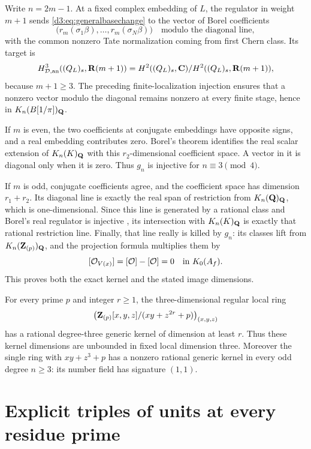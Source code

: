 Write $n=2m-1$. At a fixed complex embedding of $L$, the regulator in weight $m+1$ sends \eqref{d3:eq:generalbasechange} to the vector of Borel coefficients
\[
\bigl(r_m(\sigma_1\beta),\ldots,r_m(\sigma_N\beta)\bigr)
\quad\text{modulo the diagonal line},
\]
with the common nonzero Tate normalization coming from first Chern class. Its target is
\[
H_{\mathcal D,\mathrm{an}}^3((Q_L)_s,\mathbf R(m+1))
=H^2((Q_L)_s,\mathbf C)/H^2((Q_L)_s,\mathbf R(m+1)),
\]
because $m+1\geq3$. The preceding finite-localization injection ensures that a nonzero vector modulo the diagonal remains nonzero at every finite stage, hence in $K_n(B[1/\pi])_{\mathbf Q}$.

If $m$ is even, the two coefficients at conjugate embeddings have opposite signs, and a real embedding contributes zero. Borel's theorem \cite[Proposition~12.2]{Borel} identifies the real scalar extension of $K_n(K)_{\mathbf Q}$ with this $r_2$-dimensional coefficient space. A vector in it is diagonal only when it is zero. Thus $g_n$ is injective for $n\equiv3\pmod4$.

If $m$ is odd, conjugate coefficients agree, and the coefficient space has dimension $r_1+r_2$. Its diagonal line is exactly the real span of restriction from $K_n(\mathbf Q)_{\mathbf Q}$, which is one-dimensional. Since this line is generated by a rational class and Borel's real regulator is injective \cite[Section~6]{BunkeTamme}, its intersection with $K_n(K)_{\mathbf Q}$ is exactly that rational restriction line. Finally, that line really is killed by $g_n$: its classes lift from $K_n(\mathbf Z_{(p)})_{\mathbf Q}$, and the projection formula multiplies them by
\[
[\mathcal O_{V(x)}]=[\mathcal O]-[\mathcal O]=0\quad\text{in }K_0(A_f).
\]
This proves both the exact kernel and the stated image dimensions.

\begin{corollary}
For every prime $p$ and integer $r\geq1$, the three-dimensional regular local ring
\[
\left(\mathbf Z_{(p)}[x,y,z]/(xy+z^{2r}+p)\right)_{(x,y,z)}
\]
has a rational degree-three generic kernel of dimension at least $r$. Thus these kernel dimensions are unbounded in fixed local dimension three. Moreover the single ring with $xy+z^3+p$ has a nonzero rational generic kernel in every odd degree $n\geq3$: its number field has signature $(1,1)$.
\end{corollary}

\section{Explicit triples of units at every residue prime}\label{d3:sec:explicitallprimes}

